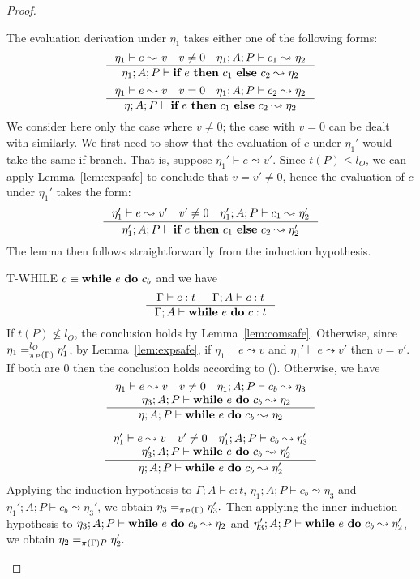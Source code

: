 {{{\begin{proof}
\begin{ProofEnumDesc}
The evaluation derivation under $\eta_1$
takes either one of the following forms:
$$
\inference{\eta_1 \vdash e \leadsto v\quad v\neq 0\quad \eta_1; A; P \vdash c_1 \leadsto \eta_2}
{\eta_1; A; P \vdash \lcIF{e}{c_1}{c_2} \leadsto \eta_2}
$$
$$
\inference{\eta_1 \vdash e \leadsto v\quad v = 0\quad \eta_1;A; P \vdash c_2 \leadsto \eta_2}
{\eta;A; P \vdash \lcIF{e}{c_1}{c_2} \leadsto \eta_2}
$$
We consider here only the case where $v\not = 0$; the case with $v=0$
can be dealt with similarly.
We first need to show that the evaluation of $c$ under $\eta_1'$
would take the same if-branch. That is, suppose $\eta_1' \vdash e \leadsto v'$.
Since $t(P) \leq l_O$, we can apply Lemma~\ref{lem:expsafe} to conclude
that $v=v' \not = 0$, hence the evaluation of $c$ under $\eta_1'$ takes the
form:
$$
\inference{\eta_1' \vdash e \leadsto v'\quad v'\neq 0\quad \eta_1'; A; P \vdash c_1 \leadsto \eta_2'}
{\eta_1'; A; P \vdash \lcIF{e}{c_1}{c_2} \leadsto \eta_2'}
$$
The lemma then follows straightforwardly from the induction hypothesis.

\item[T-WHILE] $c\equiv\textbf{while}~{e}~\textbf{do}~{c_b}$ and we have
$$
\inference
{\Gamma \vdash e : t & \Gamma ; A\vdash c : t  }
{\Gamma; A \vdash \lcWHILE{e}{c} : t }
$$
If $t(P) \nleq l_{O}$, the conclusion holds by
Lemma~\ref{lem:comsafe}. Otherwise, since
$\eta_1=_{\pi_{{P}}({\Gamma})}^{l_{O}}\eta_1'$, by
Lemma~\ref{lem:expsafe}, if
$\eta_1 \vdash e \leadsto v$ and $\eta_1' \vdash e \leadsto v'$
then $v=v'$.
If both are $0$ then the conclusion holds according to
(). Otherwise, we have
$$
\inference{
\eta_1 \vdash e \leadsto v\quad v\neq 0\quad
\eta_1;A; P \vdash c_b \leadsto \eta_3\\
\quad \eta_3 ; A ; P \vdash \lcWHILE{e}{c_b} \leadsto \eta_2
}
{\eta;A; P \vdash \lcWHILE{e}{c_b} \leadsto \eta_2}
$$

$$
\inference{
\eta_1' \vdash e \leadsto v\quad v'\neq 0\quad
\eta_1';A; P \vdash c_b \leadsto \eta_3'\\
\quad \eta_3' ; A ; P \vdash \lcWHILE{e}{c_b} \leadsto \eta_2'
}
{\eta;A; P \vdash \lcWHILE{e}{c_b} \leadsto \eta_2'}
$$
Applying the induction hypothesis to $\Gamma ; A\vdash c : t$,
$\eta_1;A; P \vdash c_b \leadsto \eta_3$ and
$\eta_1';A; P \vdash c_b \leadsto \eta_3'$, we obtain
$\eta_3 =_{\pi_{{P}}({\Gamma})} \eta_3'.$ Then applying the inner
induction hypothesis to $\eta_3 ; A ; P \vdash \textbf{while}~{e}~\textbf{do}~{c_b} \leadsto \eta_2$
and $\eta_3' ; A ; P \vdash \textbf{while}~{e}~\textbf{do}~{c_b} \leadsto \eta_2'$,
we obtain $\eta_2 =_{\app{\Gamma} P} \eta_2'.$


\end{ProofEnumDesc}
\end{proof}}}}
